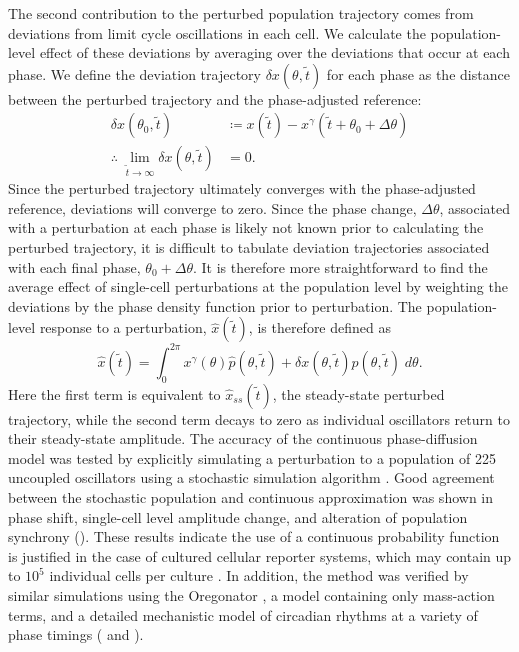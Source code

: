 The second contribution to the perturbed population trajectory comes from deviations from limit cycle oscillations in each cell.
We calculate the population-level effect of these deviations by averaging over the deviations that occur at each phase.
We define the deviation trajectory $\delta x(\theta, \tilde{t})$ for each phase as the distance between the perturbed trajectory and the phase-adjusted reference:
\begin{align}
  \delta x(\theta_0, \tilde{t}) &\coloneqq x(\tilde{t}) - x^\gamma(\tilde{t} + \theta_0 + \Delta \theta) \\
  \therefore\; \lim_{\tilde{t} \to \infty} \delta x(\theta, \tilde{t}) &= 0.
  \label{eq:deviation}
\end{align}
Since the perturbed trajectory ultimately converges with the phase-adjusted reference, deviations will converge to zero.
Since the phase change, $\Delta\theta$, associated with a perturbation at each phase is likely not known prior to calculating the perturbed trajectory, it is difficult to tabulate deviation trajectories associated with each final phase, $\theta_0 + \Delta\theta$.
It is therefore more straightforward to find the average effect of single-cell perturbations at the population level by weighting the deviations by the phase density function prior to perturbation.
The population-level response to a perturbation, $\hat{x}(\tilde{t})$, is therefore defined as
\begin{equation}
  \hat{x}(\tilde{t}) = \int_0^{2\pi} x^\gamma(\theta)\hat{p}(\theta, \tilde{t}) + \delta x(\theta, \tilde{t})p(\theta, \tilde{t}) \; d\theta.
  \label{eq:xhat}
\end{equation}
Here the first term is equivalent to $\hat{x}_{ss}(\tilde{t})$, the steady-state perturbed trajectory, while the second term decays to zero as individual oscillators return to their steady-state amplitude.
The accuracy of the continuous phase-diffusion model was tested by explicitly simulating a perturbation to a population of 225 uncoupled oscillators using a stochastic simulation algorithm \cite{Gillespie1977, Sanft2011a}.
Good agreement between the stochastic population and continuous approximation was shown in phase shift, single-cell level amplitude change, and alteration of population synchrony ().
These results indicate the use of a continuous probability function is justified in the case of cultured cellular reporter systems, which may contain up to $10^5$ individual cells per culture \cite{Welsh2004}.
In addition, the method was verified by similar simulations using the Oregonator \cite{Field1974}, a model containing only mass-action terms, and a detailed mechanistic model of circadian rhythms \cite{Hirota2012} at a variety of phase timings ( and ).
